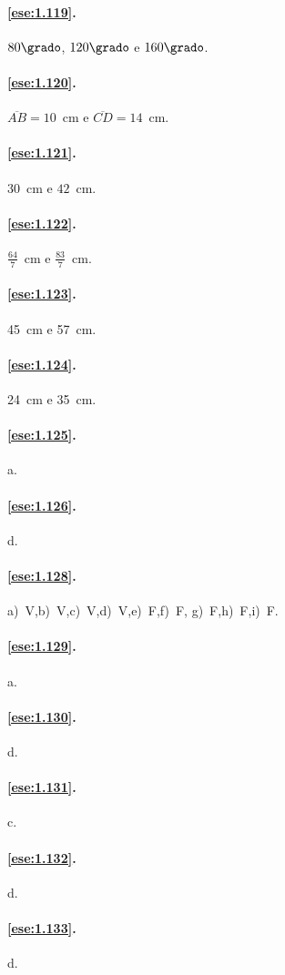 \paragraph{\ref{ese:1.119}.}
\(80\grado\), \(120\grado\) e \(160\grado\).

\paragraph{\ref{ese:1.120}.}
\(\overline{AB}=10\)~cm e \(\overline{CD}=14\)~cm.

\paragraph{\ref{ese:1.121}.}
\(30\)~cm e \(42\)~cm.

\paragraph{\ref{ese:1.122}.}
\(\frac{64}{7}\)~cm e \(\frac{83}{7}\)~cm.

\paragraph{\ref{ese:1.123}.}
45~cm e 57~cm.

\paragraph{\ref{ese:1.124}.}
24~cm e 35~cm.

\paragraph{\ref{ese:1.125}.}
a.

\paragraph{\ref{ese:1.126}.}
d.

\paragraph{\ref{ese:1.128}.}
a)~V,\quad b)~V,\quad c)~V,\quad d)~V,\quad e)~F,\quad f)~F,\quad 
g)~F,\quad h)~F,\quad i)~F.

\paragraph{\ref{ese:1.129}.}
a.

\paragraph{\ref{ese:1.130}.}
d.

\paragraph{\ref{ese:1.131}.}
c.

\paragraph{\ref{ese:1.132}.}
d.

\paragraph{\ref{ese:1.133}.}
d.

\endgroup
